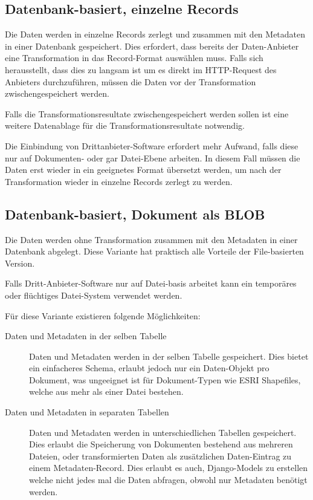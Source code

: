 \subsection{Datenbank-basiert, einzelne Records}\label{sec:pd:datenbank-records}
Die Daten werden in einzelne Records zerlegt und zusammen mit den Metadaten in einer Datenbank gespeichert. Dies erfordert, dass bereits der Daten-Anbieter eine Transformation in das Record-Format auswählen muss. Falls sich herausstellt, dass dies zu langsam ist um es direkt im HTTP-Request des Anbieters durchzuführen, müssen die Daten vor der Transformation zwischengespeichert werden.

Falls die Transformationsresultate zwischengespeichert werden sollen ist eine weitere Datenablage für die Transformationsresultate notwendig.

Die Einbindung von Drittanbieter-Software erfordert mehr Aufwand, falls diese nur auf Dokumenten- oder gar Datei-Ebene arbeiten. In diesem Fall müssen die Daten erst wieder in ein geeignetes Format übersetzt werden, um nach der Transformation wieder in einzelne Records zerlegt zu werden.

\subsection{Datenbank-basiert, Dokument als BLOB}
Die Daten werden ohne Transformation zusammen mit den Metadaten in einer Datenbank abgelegt. Diese Variante hat praktisch alle Vorteile der File-basierten Version.

Falls Dritt-Anbieter-Software nur auf Datei-basis arbeitet kann ein temporäres oder flüchtiges Datei-System verwendet werden.

Für diese Variante existieren folgende Möglichkeiten:
\begin{description}
\item[Daten und Metadaten in der selben Tabelle] Daten und Metadaten werden in der selben Tabelle gespeichert. Dies bietet ein einfacheres Schema, erlaubt jedoch nur ein Daten-Objekt pro Dokument, was ungeeignet ist für Dokument-Typen wie ESRI Shapefiles, welche aus mehr als einer Datei bestehen.
\item[Daten und Metadaten in separaten Tabellen] Daten und Metadaten werden in unterschiedlichen Tabellen gespeichert. Dies erlaubt die Speicherung von Dokumenten bestehend aus mehreren Dateien, oder transformierten Daten als zusätzlichen Daten-Eintrag zu einem Metadaten-Record. Dies erlaubt es auch, Django-Models zu erstellen welche nicht jedes mal die Daten abfragen, obwohl nur Metadaten benötigt werden.
\end{description}

